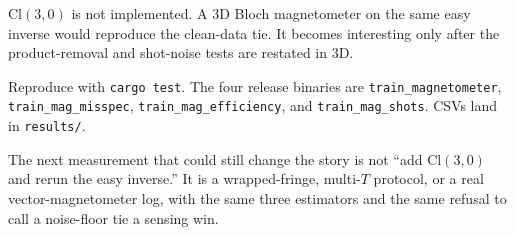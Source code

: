 \documentclass[11pt]{article}
\begin{document}
$\mathrm{Cl}(3,0)$ is not implemented.
A 3D Bloch magnetometer on the same easy inverse would reproduce the clean-data tie.
It becomes interesting only after the product-removal and shot-noise tests are restated in 3D.

{\raggedright
Reproduce with \texttt{cargo test}.
The four release binaries are
\texttt{train\_magnetometer},
\texttt{train\_mag\_misspec},
\texttt{train\_mag\_efficiency},
and \texttt{train\_mag\_shots}.
CSVs land in \texttt{results/}.
\par}

The next measurement that could still change the story is not ``add $\mathrm{Cl}(3,0)$ and rerun the easy inverse.''
It is a wrapped-fringe, multi-$T$ protocol, or a real vector-magnetometer log, with the same three estimators and the same refusal to call a noise-floor tie a sensing win.



\end{document}
